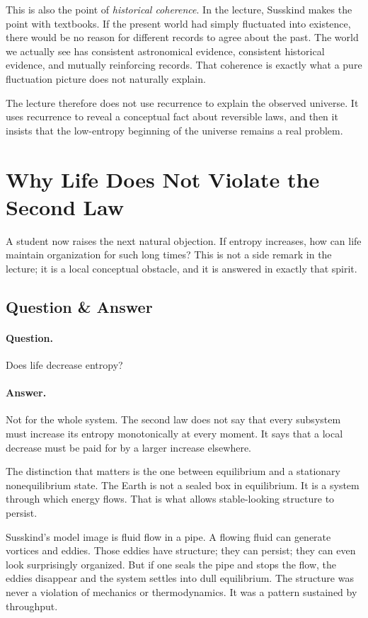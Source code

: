 This is also the point of \emph{historical coherence}. In the lecture, Susskind makes the point with textbooks. If the present world had simply fluctuated into existence, there would be no reason for different records to agree about the past. The world we actually see has consistent astronomical evidence, consistent historical evidence, and mutually reinforcing records. That coherence is exactly what a pure fluctuation picture does not naturally explain.

The lecture therefore does not use recurrence to explain the observed universe. It uses recurrence to reveal a conceptual fact about reversible laws, and then it insists that the low-entropy beginning of the universe remains a real problem.

\section{Why Life Does Not Violate the Second Law}

A student now raises the next natural objection. If entropy increases, how can life maintain organization for such long times? This is not a side remark in the lecture; it is a local conceptual obstacle, and it is answered in exactly that spirit.

\subsection{Question \& Answer}

\paragraph{Question.} Does life decrease entropy?

\paragraph{Answer.} Not for the whole system. The second law does not say that every subsystem must increase its entropy monotonically at every moment. It says that a local decrease must be paid for by a larger increase elsewhere.

The distinction that matters is the one between equilibrium and a stationary nonequilibrium state. The Earth is not a sealed box in equilibrium. It is a system through which energy flows. That is what allows stable-looking structure to persist.

Susskind's model image is fluid flow in a pipe. A flowing fluid can generate vortices and eddies. Those eddies have structure; they can persist; they can even look surprisingly organized. But if one seals the pipe and stops the flow, the eddies disappear and the system settles into dull equilibrium. The structure was never a violation of mechanics or thermodynamics. It was a pattern sustained by throughput.

